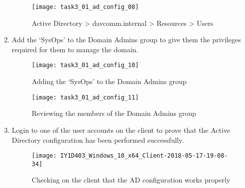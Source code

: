 \begin{enumerate}[series=task3methodology2]
    \begin{figure}[H]
      \centering
      \captionsetup{skip=2pt}
      \texttt{[image: task3\_01\_ad\_config\_08]}
      \caption{Active Directory > davcomm.internal > Resources > Users}
      \label{fig:task3:ad_config_08}
    \end{figure}
  \item Add the `SysOps' to the Domain Admins group to give them the privileges required for them to manage the domain.
    \begin{figure}[H]
      \centering
      \captionsetup{skip=2pt}
      \texttt{[image: task3\_01\_ad\_config\_10]}
      \caption{Adding the `SysOps' to the Domain Admins group}
      \label{fig:task3:ad_config_10}
    \end{figure}
    \begin{figure}[H]
      \centering
      \captionsetup{skip=2pt}
      \texttt{[image: task3\_01\_ad\_config\_11]}
      \caption{Reviewing the members of the Domain Admins group}
      \label{fig:task3:ad_config_11}
    \end{figure}
  \item Login to one of the user accounts on the client to prove that the Active Directory configuration has been performed successfully.
    \begin{figure}[H]
      \centering
      \captionsetup{skip=2pt}
      \texttt{[image: IY1D403\_Windows\_10\_x64\_Client-2018-05-17-19-08-34]}
      \caption{Checking on the client that the AD configuration works properly}
      \label{fig:task3:win10client_05}
    \end{figure}
\end{enumerate}
